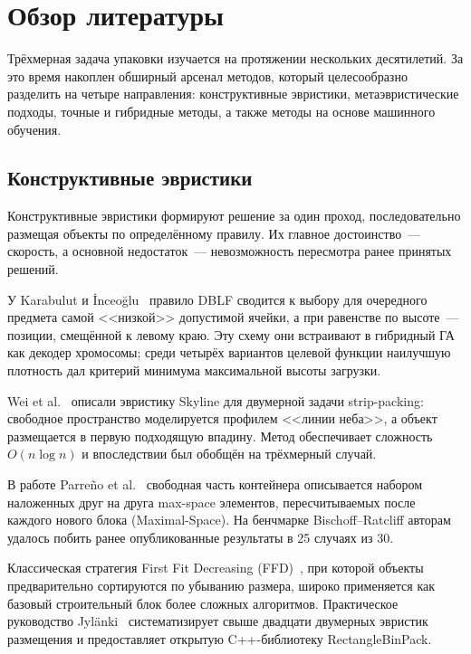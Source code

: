 \chapter{Обзор литературы}
\label{cha:Obzor}

Трёхмерная задача упаковки изучается на протяжении нескольких десятилетий. За это время накоплен обширный арсенал методов, который целесообразно разделить на четыре направления: конструктивные эвристики, метаэвристические подходы, точные и гибридные методы, а также методы на основе машинного обучения.

\section{Конструктивные эвристики}

Конструктивные эвристики формируют решение за один проход, последовательно размещая объекты по определённому правилу. Их главное достоинство~--- скорость, а основной недостаток~--- невозможность пересмотра ранее принятых решений.

У Karabulut и İnceoğlu~\cite{karabulut} правило DBLF сводится к выбору для очередного предмета самой <<низкой>> допустимой ячейки, а при равенстве по высоте~--- позиции, смещённой к левому краю. Эту схему они встраивают в гибридный ГА как декодер хромосомы; среди четырёх вариантов целевой функции наилучшую плотность дал критерий минимума максимальной высоты загрузки.

Wei et al.~\cite{Wei2011} описали эвристику Skyline для двумерной задачи strip-packing: свободное пространство моделируется профилем <<линии неба>>, а объект размещается в первую подходящую впадину. Метод обеспечивает сложность $O(n\log n)$ и впоследствии был обобщён на трёхмерный случай.

В работе Parreño et al.~\cite{Parreno2008} свободная часть контейнера описывается набором наложенных друг на друга max-space элементов, пересчитываемых после каждого нового блока (Maximal-Space). На бенчмарке Bischoff--Ratcliff авторам удалось побить ранее опубликованные результаты в 25 случаях из 30.

Классическая стратегия First Fit Decreasing (FFD)~\cite{CoffmanFFD1996}, при которой объекты предварительно сортируются по убыванию размера, широко применяется как базовый строительный блок более сложных алгоритмов. Практическое руководство Jylänki~\cite{Jylanki2010} систематизирует свыше двадцати двумерных эвристик размещения и предоставляет открытую C++-библиотеку RectangleBinPack.

